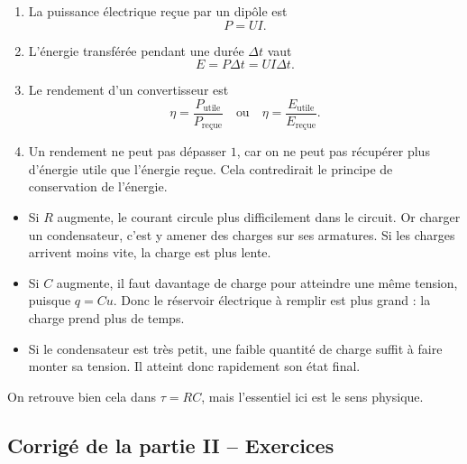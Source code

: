 \documentclass[11pt,a4paper]{article}
\begin{document}
\begin{corrigebox}
\begin{enumerate}[label=\alph*)]
    \item La puissance électrique reçue par un dipôle est
    \[
    P=UI.
    \]

    \item L'énergie transférée pendant une durée \(\Delta t\) vaut
    \[
    E=P\Delta t=UI\Delta t.
    \]

    \item Le rendement d'un convertisseur est
    \[
    \eta=\frac{P_{\text{utile}}}{P_{\text{reçue}}}
    \quad \text{ou} \quad
    \eta=\frac{E_{\text{utile}}}{E_{\text{reçue}}}.
    \]

    \item Un rendement ne peut pas dépasser \(1\), car on ne peut pas récupérer plus d'énergie utile que l'énergie reçue. Cela contredirait le principe de conservation de l'énergie.
\end{enumerate}
\end{corrigebox}

\begin{corrigebox}
\begin{itemize}
    \item Si \(R\) augmente, le courant circule plus difficilement dans le circuit. Or charger un condensateur, c'est y amener des charges sur ses armatures. Si les charges arrivent moins vite, la charge est plus lente.
    \item Si \(C\) augmente, il faut davantage de charge pour atteindre une même tension, puisque \(q=Cu\). Donc le réservoir électrique à remplir est plus grand : la charge prend plus de temps.
    \item Si le condensateur est très petit, une faible quantité de charge suffit à faire monter sa tension. Il atteint donc rapidement son état final.
\end{itemize}

On retrouve bien cela dans \(\tau=RC\), mais l'essentiel ici est le sens physique.
\end{corrigebox}

\subsection{Corrigé de la partie II -- Exercices}
\end{document}
